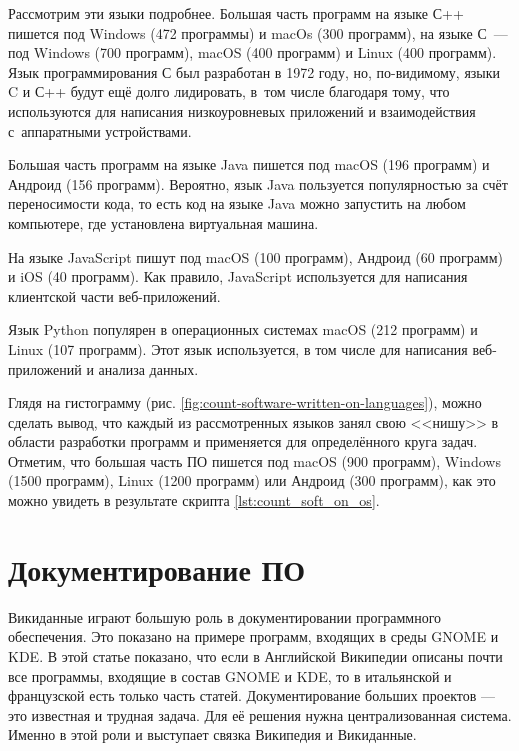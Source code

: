 Рассмотрим эти языки подробнее. 
Большая часть программ на языке С++ пишется под Windows (472 программы) и macOs (300 программ), 
на языке С~--- под Windows (700 программ), macOS (400 программ) и Linux (400 программ). 
Язык программирования С был разработан в 1972 году, 
но, по-видимому, языки C и С++ будут ещё долго лидировать, 
в~том числе благодаря тому, что используются для написания низкоуровневых приложений 
и взаимодействия с~аппаратными устройствами\autocite{FutureProgrLang2016}.

Большая часть программ на языке Java пишется под macOS (196 программ) и Андроид (156 программ). 
Вероятно, язык Java пользуется популярностью 
за счёт переносимости кода, 
то есть код на языке Java можно запустить на любом компьютере, 
где установлена виртуальная машина. 

На языке JavaScript пишут под macOS (100 программ), 
Андроид (60 программ) и iOS (40 программ). Как правило, 
JavaScript используется для написания клиентской части веб-приложений.

Язык Python популярен в операционных системах macOS (212 программ) и Linux (107 программ). 
Этот язык используется, в том числе для написания веб-приложений и анализа данных.

Глядя на гистограмму (рис. \ref{fig:count-software-written-on-languages}), можно сделать вывод, что каждый из рассмотренных языков занял свою <<нишу>> в области разработки программ и применяется для определённого круга задач. Отметим, что большая часть ПО пишется под macOS (900 программ), Windows (1500 программ), Linux (1200 программ) или Андроид (300 программ), как это можно увидеть в результате скрипта \ref{lst:count_soft_on_os}.

\section{Документирование ПО}
Викиданные играют большую роль в документировании программного обеспечения. Это показано на примере программ, входящих в среды GNOME и KDE\autocite{Samuel2020DocumentingWiki}. В этой статье показано, что если в Английской Википедии описаны почти все программы, входящие в состав GNOME и KDE, то в итальянской и французской есть только часть статей. Документирование больших проектов --- это известная и трудная задача. Для её решения нужна централизованная система. Именно в этой роли и выступает связка Википедия и Викиданные\autocite{Samuel2020DocumentingWiki}.

